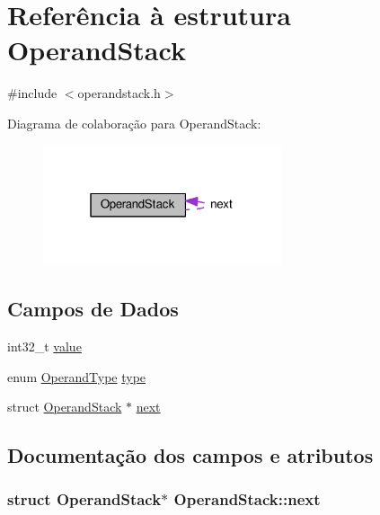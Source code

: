 \hypertarget{structOperandStack}{}\section{Referência à estrutura Operand\+Stack}
\label{structOperandStack}


{\ttfamily \#include $<$operandstack.\+h$>$}



Diagrama de colaboração para Operand\+Stack\+:\nopagebreak
\begin{figure}[H]
\begin{center}
\leavevmode
\includegraphics[width=199pt]{structOperandStack__coll__graph}
\end{center}
\end{figure}
\subsection*{Campos de Dados}
\begin{DoxyCompactItemize}
\item 
int32\+\_\+t \hyperlink{structOperandStack_a931d181370bfdb5b41edb8fe488c3b90}{value}
\item 
enum \hyperlink{operandstack_8h_aa4b9b8291a90b1a586c468110fb346a4}{Operand\+Type} \hyperlink{structOperandStack_a757f9fff730b28c1df05b0226d93416f}{type}
\item 
struct \hyperlink{structOperandStack}{Operand\+Stack} $\ast$ \hyperlink{structOperandStack_a6ebcd214896350aa3c1e300ab5ea6f8e}{next}
\end{DoxyCompactItemize}


\subsection{Documentação dos campos e atributos}
\subsubsection[{\texorpdfstring{next}{next}}]{\setlength{\rightskip}{0pt plus 5cm}struct {\bf Operand\+Stack}$\ast$ Operand\+Stack\+::next}\hypertarget{structOperandStack_a6ebcd214896350aa3c1e300ab5ea6f8e}{}\label{structOperandStack_a6ebcd214896350aa3c1e300ab5ea6f8e}
